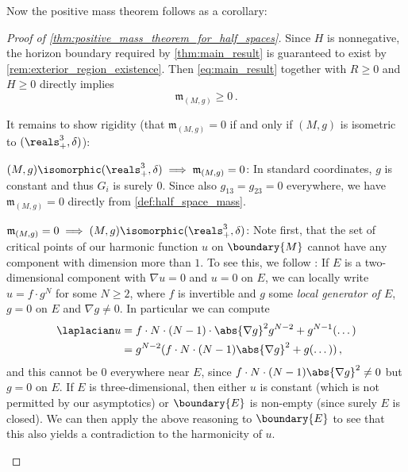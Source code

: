 \documentclass[titlepage,numbers=noenddot,oneside,%
cleardoublepage=empty,paper=a4,fontsize=11pt,%
english,%
]{scrartcl}
\newcommand*{\mathcomma}{\,,}
\newcommand*{\mathfullstop}{\,.}
\newcommand{\mass}[2]{\mathfrak{m}_{(#1,#2)}} %
\begin{document}
Now the positive mass theorem follows as a corollary:
\begin{proof}[Proof of \cref{thm:positive_mass_theorem_for_half_spaces}]
    Since \( H \) is nonnegative, the horizon boundary required by \cref{thm:main_result} is guaranteed to exist by \cref{rem:exterior_region_existence}. Then \cref{eq:main_result} together with \( R\geq 0 \) and \( H\geq 0 \) directly implies
    \begin{equation*}
        \mass{M}{g}\geq 0\mathfullstop
    \end{equation*}

    It remains to show rigidity (\ie that \( \mass{M}{g}=0 \) if and only if \( (M,g)\) is isometric to \( (\reals^3_{+},\delta) \)):
    \begin{proofdescription}
        \item{\( (M,g)\isomorphic(\reals^3_{+},\delta) \implies \mass{M}{g}=0   \):} In standard coordinates, \( g \) is constant and thus \( G_i \) is surely \( 0 \). Since also \( g_{13}=g_{23}=0 \) everywhere, we have \( \mass{M}{g}=0 \) directly from \cref{def:half_space_mass}. 
        \item{\(  \mass{M}{g}=0 \implies (M,g)\isomorphic(\reals^3_{+},\delta) \):} 
        Note first, that the set of critical points of our harmonic function \( u \) on \( \boundary{M} \) cannot have any component with dimension more than \( 1  \). To see this, we follow \cite[Section 4 Lemma 1]{goldsteinGradientFlowHarmonic2009}: If \( E \) is a two-dimensional component with \( \nabla u=0 \) and \( u=0 \) on \( E \), we can locally write \( u=f\cdot g^N \) for some \( N\geq 2 \), where \( f \) is invertible and \( g \) some \emph{local generator of \( E \)}, \ie \( g=0 \) on \( E \) and \( \nabla g\neq 0 \). In particular we can compute
        \begin{equation*}
            \begin{aligned}[t]
                \laplacian u&=f\cdot N\cdot (N-1)\cdot \abs{\nabla g}^2 g^{N-2}+g^{N-1}(\dotsc)\\
                &=g^{N-2}(f\cdot N\cdot (N-1)\abs{\nabla g}^2+g(\dotsc))\mathcomma
            \end{aligned}
        \end{equation*}
        and this cannot be \( 0 \) everywhere near \( E \), since \( f\cdot N\cdot (N-1)\abs{\nabla g}^2\neq 0 \) but \( g=0 \) on \( E \). If \( E \) is three-dimensional, then either \( u \) is constant (which is not permitted by our asymptotics) or \( \boundary{E} \) is non-empty (since surely \( E \) is closed). We can then apply the above reasoning to \( \boundary{E} \) to see that this also yields a contradiction to the harmonicity of \( u \).


\end{proofdescription}
\end{proof}
\end{document}
